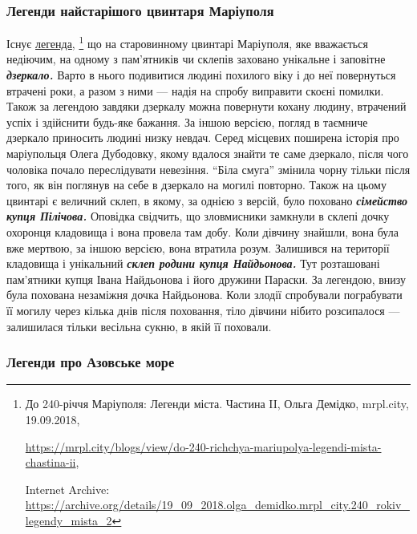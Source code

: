 \subsubsection{Легенди найстарішого цвинтаря Маріуполя}


Існує \href{https://archive.org/details/19_09_2018.olga_demidko.mrpl_city.240_rokiv_legendy_mista_2}{легенда},%
\footnote{До 240-річчя Маріуполя: Легенди міста. Частина II, Ольга Демідко, mrpl.city, 19.09.2018, \par%
\url{https://mrpl.city/blogs/view/do-240-richchya-mariupolya-legendi-mista-chastina-ii}, \par%
Internet Archive: \url{https://archive.org/details/19_09_2018.olga_demidko.mrpl_city.240_rokiv_legendy_mista_2}%
} що на старовинному цвинтарі Маріуполя, яке вважається недіючим,
на одному з пам'ятників чи склепів заховано унікальне і заповітне \emph{\textbf{дзеркало.}}
Варто в нього подивитися людині похилого віку і до неї повернуться втрачені
роки, а разом з ними — надія на спробу виправити скоєні помилки. Також за
легендою завдяки дзеркалу можна повернути кохану людину, втрачений успіх і
здійснити будь-яке бажання. За іншою версією, погляд в таємниче дзеркало
приносить людині низку невдач. Серед місцевих поширена історія про маріупольця
Олега Дубодовку, якому вдалося знайти те саме дзеркало, після чого чоловіка
почало переслідувати невезіння. \enquote{Біла смуга} змінила чорну тільки після того,
як він поглянув на себе в дзеркало на могилі повторно. Також на цьому цвинтарі
є величний склеп, в якому, за однією з версій, було поховано \emph{\textbf{сімейство купця
Пілічова.}} Оповідка свідчить, що зловмисники замкнули в склепі дочку охоронця
кладовища і вона провела там добу. Коли дівчину знайшли, вона була вже мертвою,
за іншою версією, вона втратила розум. Залишився на території кладовища і
унікальний \emph{\textbf{склеп родини купця Найдьонова.}} Тут розташовані пам'ятники купця
Івана Найдьонова і його дружини Параски. За легендою, внизу була похована
незаміжня дочка Найдьонова. Коли злодії спробували пограбувати її могилу через
кілька днів після поховання, тіло дівчини нібито розсипалося — залишилася
тільки весільна сукню, в якій її поховали.

\subsubsection{Легенди про Азовське море}

